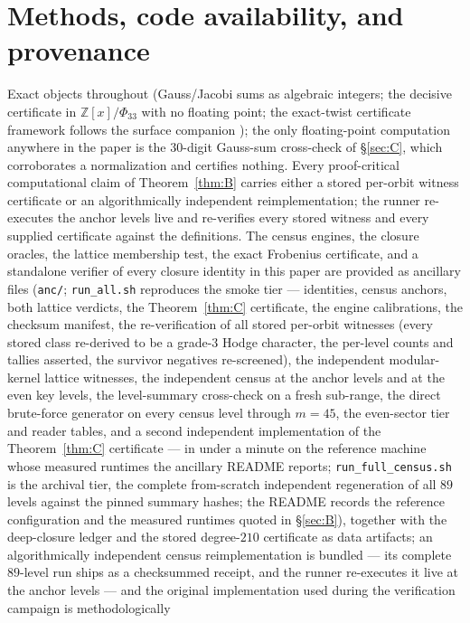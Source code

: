 \documentclass[11pt]{amsart}
\theoremstyle{remark}
\newcommand{\Z}{\mathbb{Z}}
\begin{document}
\section{Methods, code availability, and provenance}\label{sec:methods}
Exact objects throughout (Gauss/Jacobi sums as algebraic integers; the decisive certificate in
$\Z[x]/\Phi_{33}$ with no floating point; the exact-twist certificate framework follows the surface
companion \cite{P1}); the only floating-point computation anywhere in the paper is the $30$-digit
Gauss-sum cross-check of \S\ref{sec:C}, which corroborates a normalization and certifies
nothing.
Every proof-critical computational claim of Theorem~\ref{thm:B} carries either a stored
per-orbit witness certificate or an algorithmically independent reimplementation; the runner
re-executes the anchor levels live and re-verifies every stored witness and every supplied
certificate against the definitions.
The census engines, the closure oracles, the lattice membership test, the exact Frobenius certificate,
and a standalone verifier of every closure identity in this paper are provided as ancillary files
(\texttt{anc/}; \texttt{run\_all.sh} reproduces the smoke tier --- identities, census anchors, both
lattice verdicts, the Theorem~\ref{thm:C} certificate, the engine calibrations, the checksum
manifest, the re-verification of all stored per-orbit witnesses (every stored class re-derived to
be a grade-$3$ Hodge character, the per-level counts and tallies asserted, the survivor negatives
re-screened), the independent modular-kernel lattice witnesses, the independent census at the
anchor levels and at the even key levels, the level-summary cross-check on a fresh sub-range, the
direct brute-force generator on every census level through $m=45$, the even-sector tier and
reader tables, and a second independent implementation of the Theorem~\ref{thm:C} certificate ---
in under a minute on the reference machine whose measured runtimes the ancillary README
reports;
\texttt{run\_full\_census.sh} is the archival tier, the
complete from-scratch independent regeneration of all $89$ levels against the pinned summary
hashes; the README records the reference configuration and the measured runtimes quoted in
\S\ref{sec:B}), together with the deep-closure ledger and the stored degree-$210$ certificate as data
artifacts; an algorithmically independent census reimplementation is bundled --- its complete $89$-level
run ships as a checksummed receipt, and the runner re-executes it live at the anchor levels ---
and the original implementation used during the verification campaign is methodologically
\end{document}
